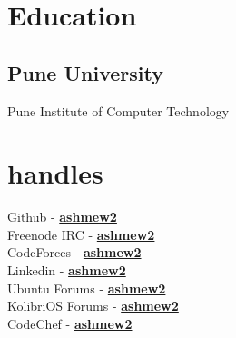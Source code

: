 \documentclass[letterpaper]{deedy-resume} %
\begin{document}
\lastupdated %
\begin{minipage}[t]{0.33\textwidth} %
\section{Education}
\subsection{Pune University}
Pune Institute of Computer Technology \\
\sectionspace %
\section{handles}
Github - \href{https://github.com/ashmew2}{\bf ashmew2} \\
Freenode IRC - \href{http://freenode.org} {\bf ashmew2} \\
CodeForces - \href{http://codeforces.com/profile/ashmew2}{\bf ashmew2} \\
Linkedin - \href{in.linkedin.com/in/ashmew2} {\bf ashmew2} \\
Ubuntu Forums - \href{http://ubuntuforums.org/showthread.php?t=821461} {\bf ashmew2} \\
KolibriOS Forums - \href{http://board.kolibrios.org/memberlist.php?mode=viewprofile&u=6211} {\bf ashmew2} \\
CodeChef - \href{http://www.codechef.com/users/ashmew2}{\bf ashmew2} \\
\sectionspace %

\end{minipage}
\end{document}
